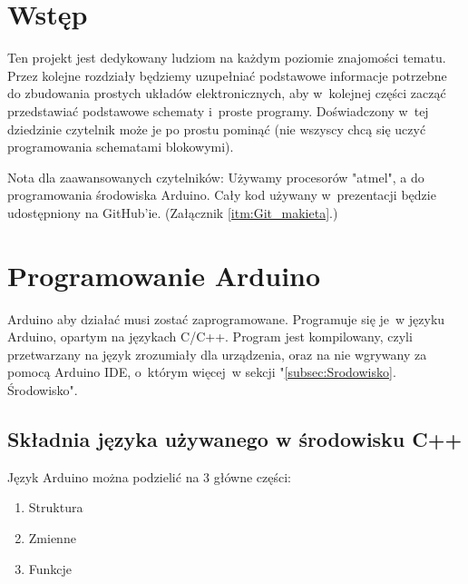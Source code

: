 \documentclass[a4paper,12pt, twoside]{article}
\let\oldsection\section		%
\renewcommand\section{\clearpage\oldsection}%
\begin{document}
\newpage\null\thispagestyle{empty}\newpage


\thispagestyle{empty}
\tableofcontents 
\pagestyle{style1}

\thispagestyle {empty}

\section*{Wstęp}
\pagestyle{style2}
Ten projekt jest dedykowany ludziom na każdym poziomie znajomości tematu. Przez kolejne rozdziały będziemy uzupełniać podstawowe informacje potrzebne do zbudowania prostych układów elektronicznych, aby w~kolejnej części zacząć przedstawiać podstawowe schematy i~proste programy. Doświadczony w~tej dziedzinie czytelnik może je po prostu pominąć (nie wszyscy chcą się uczyć programowania schematami blokowymi). 

Nota dla zaawansowanych czytelników:
Używamy procesorów "atmel", a do programowania środowiska Arduino. Cały kod używany w~prezentacji będzie udostępniony na GitHub'ie. (Załącznik \ref{itm:Git_makieta}.)

\section{Programowanie Arduino}
\pagestyle{style1}
Arduino aby działać musi zostać zaprogramowane. Programuje się je~w  języku Arduino, opartym na językach C/C++.
Program jest kompilowany, czyli przetwarzany na język zrozumiały dla urządzenia, oraz na nie wgrywany za pomocą
Arduino IDE, o~którym więcej~w  sekcji "\ref{subsec:Srodowisko}. Środowisko". 


\subsection {Składnia języka używanego w  środowisku C++}
  Język Arduino można podzielić na 3 główne części:
  \begin{enumerate}
	\item Struktura
	\item Zmienne
	\item Funkcje
\end{enumerate}
\end{document}
